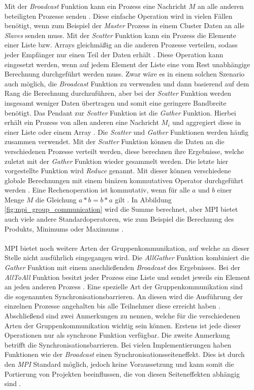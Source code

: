 Mit der \emph{Broadcast} Funktion kann ein Prozess eine Nachricht $M$ an alle anderen beteiligten Prozesse senden \cite{dongarra1995introduction}. Diese einfache Operation wird in vielen Fällen benötigt, wenn zum Beispiel der \emph{Master} Prozess in einem Cluster Daten an alle \emph{Slaves} senden muss. Mit der \emph{Scatter} Funktion kann ein Prozess die Elemente einer Liste bzw. Arrays gleichmäßig an die anderen Prozesse verteilen, sodass jeder Empfänger nur einen Teil der Daten erhält \cite{nielsen2016introduction}. Diese Operation kann eingesetzt werden, wenn auf jedem Element der Liste eine vom Rest unabhängige Berechnung durchgeführt werden muss. Zwar wäre es in einem solchen Szenario auch möglich, die \emph{Broadcast} Funktion zu verwenden und dann basierend auf dem Rang die Berechnung durchzuführen, aber bei der \emph{Scatter} Funktion werden insgesamt weniger Daten übertragen und somit eine geringere Bandbreite benötigt. Das Pendant zur \emph{Scatter} Funktion ist die \emph{Gather} Funktion. Hierbei erhält ein Prozess von allen anderen eine Nachricht $M_i$ und aggregiert diese in einer Liste oder einem Array \cite{nielsen2016introduction}. Die \emph{Scatter} und \emph{Gather} Funktionen werden häufig zusammen verwendet. Mit der \emph{Scatter} Funktion können die Daten an die verschiedenen Prozesse verteilt werden, diese berechnen ihre Ergebnisse, welche zuletzt mit der \emph{Gather} Funktion wieder gesammelt werden. Die letzte hier vorgestellte Funktion wird \emph{Reduce} genannt. Mit dieser können verschiedene globale Berechnungen mit einem binären kommutativen Operator durchgeführt werden \cite{nielsen2016introduction}. Eine Rechenoperation ist kommutativ, wenn für alle $a$ und $b$ einer Menge $M$  die Gleichung $a*b=b*a$ gilt \cite{walz2011brueckenkurs}. In Abbildung \ref{fig:mpi_group_communication} wird die Summe berechnet, aber \ac{MPI} bietet auch viele andere Standardoperatoren, wie zum Beispiel die Berechnung des Produkts, Minimums oder Maximums \cite{nielsen2016introduction}. 
\\\\
\ac{MPI} bietet noch weitere Arten der Gruppenkommunikation, auf welche an dieser Stelle nicht ausführlich eingegangen wird. Die \emph{AllGather} Funktion kombiniert die \emph{Gather} Funktion mit einem anschließenden \emph{Broadcast} des Ergebnisses. Bei der \emph{AllToAll} Funktion besitzt jeder Prozess eine Liste und sendet jeweils ein Element an jeden anderen Prozess \cite{dongarra1995introduction}. Eine spezielle Art der Gruppenkommunikation sind die sogenannten Synchronisationsbarrieren. An diesen wird die Ausführung der einzelnen Prozesse angehalten bis alle Teilnehmer diese erreicht haben \cite{nielsen2016introduction}. Abschließend sind zwei Anmerkungen zu nennen, welche für die verschiedenen Arten der Gruppenkommunikation wichtig sein können. Erstens ist jede dieser Operationen nur als synchrone Funktion verfügbar. Die zweite Anmerkung betrifft die Synchronisationsbarrieren. Bei vielen Implementierungen haben Funktionen wie der \emph{Broadcast} einen Synchronisationsseiteneffekt. Dies ist durch den \emph{MPI} Standard möglich, jedoch keine Voraussetzung und kann somit die Portierung von Projekten beeinflussen, die von diesen Seiteneffekten abhängig sind \cite{dongarra1995introduction}.

